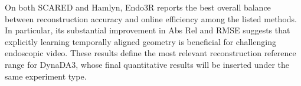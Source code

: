 \begin{table}[htbp]
    \centering
    \caption[Depth reconstruction results]{Comparison of depth-oriented reconstruction results on SCARED and Hamlyn, condensed from Endo3R~\cite{endo3r2025}.}
    \label{tab:depth_reconstruction}
\end{table}

On both SCARED and Hamlyn, Endo3R reports the best overall balance between reconstruction accuracy and online efficiency among the listed methods. In particular, its substantial improvement in Abs Rel and RMSE suggests that explicitly learning temporally aligned geometry is beneficial for challenging endoscopic video. These results define the most relevant reconstruction reference range for DynaDA3, whose final quantitative results will be inserted under the same experiment type.

